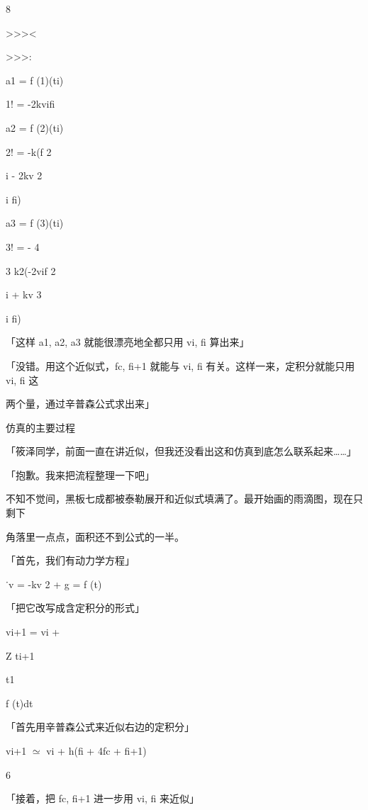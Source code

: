 8\par
>>><\par
>>>:\par
a1 = f (1)(ti)\par
1! = -2kvifi\par
a2 = f (2)(ti)\par
2! = -k(f 2\par
i - 2kv 2\par
i fi)\par
a3 = f (3)(ti)\par
3! = - 4\par
3 k2(-2vif 2\par
i + kv 3\par
i fi)\par
「这样 a1, a2, a3 就能很漂亮地全都只用 vi, fi 算出来」\par
「没错。用这个近似式，fc, fi+1 就能与 vi, fi 有关。这样一来，定积分就能只用 vi, fi 这\par
两个量，通过辛普森公式求出来」\par
仿真的主要过程\par
「筱泽同学，前面一直在讲近似，但我还没看出这和仿真到底怎么联系起来……」\par
「抱歉。我来把流程整理一下吧」\par
不知不觉间，黑板七成都被泰勒展开和近似式填满了。最开始画的雨滴图，现在只剩下\par
角落里一点点，面积还不到公式的一半。\par
「首先，我们有动力学方程」\par
˙v = -kv 2 + g = f (t)\par
「把它改写成含定积分的形式」\par
vi+1 = vi +\par
Z ti+1\par
t1\par
f (t)dt\par
「首先用辛普森公式来近似右边的定积分」\par
vi+1 $\simeq$ vi + h(fi + 4fc + fi+1)\par
6\par
「接着，把 fc, fi+1 进一步用 vi, fi 来近似」\par


